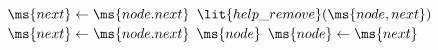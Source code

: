 \begin{algorithm*}[!ht]
\begin{algorithmic}[1]
\begin{multicols}{3}
{{				
				\State $\ms{next} \gets \ms{node.next}$ \label{lfline:val-next}
				 \label{lfline:get-helpcheck}
					\State $\lit{help\_remove}(\ms{node, next})$ \label{lfline:get-help}
					\State $\ms{next} \gets \ms{node.next}$
				\EndIf
				 \label{lfline:get-node} \label{lfline:val-check}
					\Return $\ms{node}$ \EndReturn
				\EndIf
				\State $\ms{node} \gets \ms{next}$ \label{lfline:get-while2f}
			\EndWhile
		}\EndPart



   	

				


	}
    \end{multicols}
  \end{algorithmic}
\algtechrepend
\end{algorithm*}
